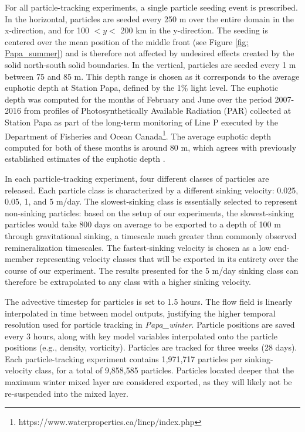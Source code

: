 \documentclass[draft,linenumbers]{agujournal2018}
\begin{document}
For all particle-tracking experiments, a single particle seeding event is prescribed. In the horizontal, particles are seeded every 250 m over the entire domain in the x-direction, and for 100 $<y<$ 200 km in the y-direction. The seeding is centered over the mean position of the middle front (see Figure \ref{fig: Papa_summer}) and is therefore not affected by undesired effects created by the solid north-south solid boundaries. In the vertical, particles are seeded every 1 m between 75 and 85 m. This depth range is chosen as it corresponds to the average euphotic depth at Station Papa, defined by the 1\% light level. The euphotic depth was computed for the months of February and June over the period 2007-2016 from profiles of Photosynthetically Available Radiation (PAR) collected at Station Papa as part of the long-term monitoring of Line P executed by the Department of Fisheries and Ocean Canada\footnote{https://www.waterproperties.ca/linep/index.php}. The average euphotic depth computed for both of these months is around 80 m, which agrees with previously established estimates of the euphotic depth \citep{Sherry_1999,Harrison_2004}.

In each particle-tracking experiment, four different classes of particles are released. Each particle class is characterized by a different sinking velocity: 0.025, 0.05, 1, and 5 m/day. The slowest-sinking class is essentially selected to represent non-sinking particles: based on the setup of our experiments, the slowest-sinking particles would take 800 days on average to be exported to a depth of 100 m through gravitational sinking, a timescale much greater than commonly observed remineralization timescales. The fastest-sinking velocity is chosen as a low end-member representing velocity classes that will be exported in its entirety over the course of our experiment. The results presented for the 5 m/day sinking class can therefore be extrapolated to any class with a higher sinking velocity.

The advective timestep for particles is set to 1.5 hours. The flow field is linearly interpolated in time between model outputs, justifying the higher temporal resolution used for particle tracking in \textit{Papa\_winter}. Particle positions are saved every 3 hours, along with key model variables interpolated onto the particle positions (e.g., density, vorticity). Particles are tracked for three weeks (28 days). Each particle-tracking experiment contains 1,971,717 particles per sinking-velocity class, for a total of 9,858,585 particles. Particles located deeper that the maximum winter mixed layer \citep[i.e., 100 m;][]{Pelland_2016, Plant_2016} are considered exported, as they will likely not be re-suspended into the mixed layer. %
\end{document}
